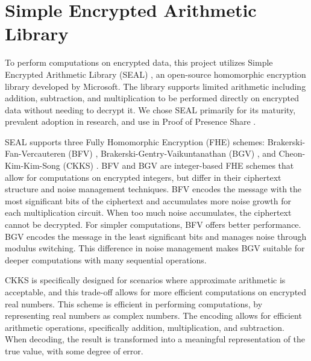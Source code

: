 \section{Simple Encrypted Arithmetic Library}

To perform computations on encrypted data, this project utilizes Simple Encrypted Arithmetic Library (SEAL) \cite{sealcrypto}, an open-source homomorphic encryption library developed by Microsoft. The library supports limited arithmetic including addition, subtraction, and multiplication to be performed directly on encrypted data without needing to decrypt it. We chose SEAL primarily for its maturity, prevalent adoption in research, and use in Proof of Presence Share \cite{Lagesse2021-PopShare}.

SEAL supports three Fully Homomorphic Encryption (FHE) schemes: Brakerski-Fan-Vercauteren (BFV) \cite{fan2012-bfv}, Brakerski-Gentry-Vaikuntanathan (BGV) \cite{brakerski2012-bgv}, and Cheon-Kim-Kim-Song (CKKS) \cite{Cheon2017-CKKS}. BFV and BGV are integer-based FHE schemes that allow for computations on encrypted integers, but differ in their ciphertext structure and noise management techniques. BFV encodes the message with the most significant bits of the ciphertext and accumulates more noise growth for each multiplication circuit. When too much noise accumulates, the ciphertext cannot be decrypted. For simpler computations, BFV offers better performance. BGV encodes the message in the least significant bits and manages noise through modulus switching. This difference in noise management makes BGV suitable for deeper computations with many sequential operations. 

CKKS is specifically designed for scenarios where approximate arithmetic is acceptable, and this trade-off allows for more efficient computations on encrypted real numbers. This scheme is efficient in performing computations, by representing real numbers as complex numbers. The encoding allows for efficient arithmetic operations, specifically addition, multiplication, and subtraction. When decoding, the result is transformed into a meaningful representation of the true value, with some degree of error. 

